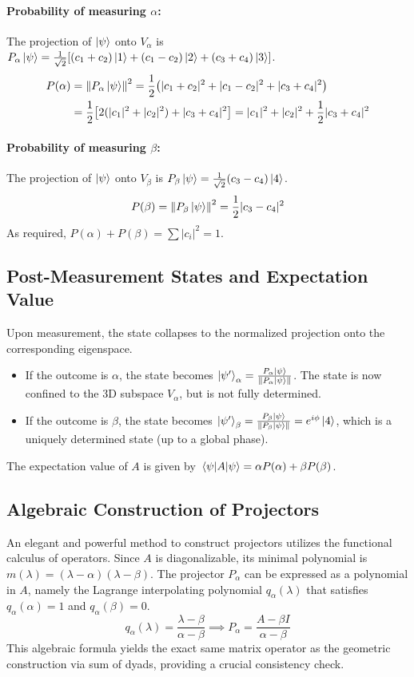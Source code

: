 \documentclass[11pt,a4paper]{article}
\begin{document}
\paragraph{Probability of measuring $\alpha$:}
The projection of $\ket{\psi}$ onto $V_\alpha$ is $P_\alpha \ket{\psi} =
\frac{1}{\sqrt{2}} [ (c_1+c_2)\ket{1} + (c_1-c_2)\ket{2} + (c_3+c_4)\ket{3} ]$.
\begin{align*}
  P(\alpha) &= \norm{P_\alpha \ket{\psi}}^2 = \frac{1}{2} \qty( |c_1+c_2|^2 +
    |c_1-c_2|^2 + |c_3+c_4|^2 ) \\
            &= \frac{1}{2} \qty[ 2(|c_1|^2 + |c_2|^2) + |c_3+c_4|^2 ] = |c_1|^2
              + |c_2|^2 + \frac{1}{2}|c_3+c_4|^2
\end{align*}

\paragraph{Probability of measuring $\beta$:}
The projection of $\ket{\psi}$ onto $V_\beta$ is $P_\beta \ket{\psi} =
\frac{1}{\sqrt{2}} (c_3-c_4)\ket{4}$.
$$
P(\beta) = \norm{P_\beta \ket{\psi}}^2 = \frac{1}{2} |c_3-c_4|^2
$$
As required, $P(\alpha) + P(\beta) = \sum |c_i|^2 = 1$.

\subsection{Post-Measurement States and Expectation Value}
Upon measurement, the state collapses to the normalized projection onto the
corresponding eigenspace.
\begin{itemize}
  \item If the outcome is $\alpha$, the state becomes $\ket{\psi'}_\alpha =
    \frac{P_\alpha \ket{\psi}}{\norm{P_\alpha \ket{\psi}}}$. The state is now
    confined to the 3D subspace $V_\alpha$, but is not fully determined.
  \item If the outcome is $\beta$, the state becomes $\ket{\psi'}_\beta =
    \frac{P_\beta \ket{\psi}}{\norm{P_\beta \ket{\psi}}} = e^{i\phi}\ket{4}$,
    which is a uniquely determined state (up to a global phase).
\end{itemize}
The expectation value of $A$ is given by $\expval{A}{\psi} = \alpha P(\alpha) +
\beta P(\beta)$.

\subsection{Algebraic Construction of Projectors}
An elegant and powerful method to construct projectors utilizes the functional
calculus of operators. Since $A$ is diagonalizable, its minimal polynomial is
$m(\lambda) = (\lambda-\alpha)(\lambda-\beta)$. The projector $P_\alpha$ can be
expressed as a polynomial in $A$, namely the Lagrange interpolating polynomial
$q_\alpha(\lambda)$ that satisfies $q_\alpha(\alpha)=1$ and
$q_\alpha(\beta)=0$.
$$
q_\alpha(\lambda) = \frac{\lambda - \beta}{\alpha - \beta} \implies P_\alpha =
\frac{A - \beta I}{\alpha - \beta}
$$
This algebraic formula yields the exact same matrix operator as the geometric
construction via sum of dyads, providing a crucial consistency check.
\end{document}
